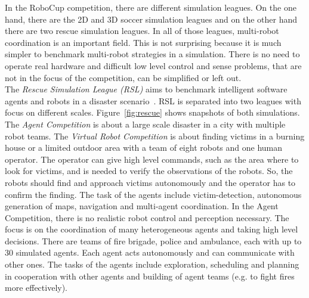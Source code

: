 In the RoboCup competition, there are different simulation leagues. On the one hand, there are the 2D and 3D soccer simulation leagues and on the other hand there are two rescue simulation leagues. In all of those leagues, multi-robot coordination is an important field. This is not surprising because it is much simpler to benchmark multi-robot strategies in a simulation. There is no need to operate real hardware and difficult low level control and sense problems, that are not in the focus of the competition, can be simplified or left out.\\
The \textit{Rescue Simulation League (RSL)} aims to benchmark intelligent software agents and robots in a disaster scenario~\cite{rescue_simulation_league}. RSL is separated into two leagues with focus on different scales. Figure~\ref{fig:rescue} shows snapshots of both simulations. The \textit{Agent Competition} is about a large scale disaster in a city with multiple robot teams. The \textit{Virtual Robot Competition} is about finding victims in a burning house or a limited outdoor area with a team of eight robots and one human operator. The operator can give high level commands, such as the area where to look for victims, and is needed to verify the observations of the robots. So, the robots should find and approach victims autonomously and the operator has to confirm the finding. The task of the agents include victim-detection, autonomous generation of maps, navigation and multi-agent coordination. In the Agent Competition, there is no realistic robot control and perception necessary. The focus is on the coordination of many heterogeneous agents and taking high level decisions. There are teams of fire brigade, police and ambulance, each with up to 30 simulated agents. Each agent acts autonomously and can communicate with other ones. The tasks of the agents include exploration, scheduling and planning in cooperation with other agents and building of agent teams (e.g. to fight fires more effectively).\\
